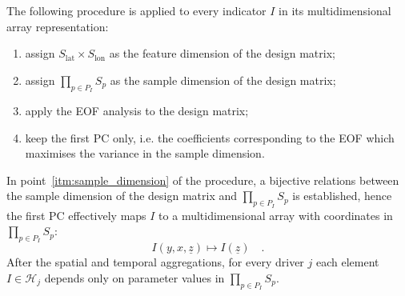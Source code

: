 The following procedure is applied to every \gls{indicator} $I$ in its multidimensional array representation:
\begin{enumerate}
  \item assign $S_\text{lat} \times S_\text{lon}$ as the feature dimension of the design matrix;
  \item \label{itm:sample_dimension} assign $\prod_{p \in P_I} S_p$ as the sample dimension of the design matrix;
  \item apply the \gls{EOF} analysis to the design matrix;
  \item keep the first \gls{PC} only, i.e. the coefficients corresponding to the \gls{EOF} which maximises the variance in the sample dimension.
\end{enumerate}
In point~\ref{itm:sample_dimension} of the procedure, a bijective relations between the sample dimension of the design matrix and $\prod_{p \in P_I} S_p$ is established, hence the first \gls{PC} effectively maps $I$ to a multidimensional array with coordinates in $\prod_{p \in P_I} S_p$:
\begin{equation}
  \label{eq:spatial_aggregation}
  I(y, x, \underline{z}) \mapsto I(\underline{z})%
  \quad .
\end{equation}
After the spatial and temporal aggregations, for every \gls{driver} $j$ each element $I \in \mathcal{H}_j$ depends only on parameter values in $\prod_{p \in P_I} S_p$.

